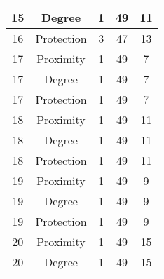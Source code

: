 \documentclass[results.tex]{subfiles}
\begin{document}
\begin{center}
\begin{tabular}{| c || c | c | c | c |}
            \hline
            15                      & Degree                       & 1                      & 49                      & 11                   \\
            \hline
            16                      & Protection                   & 3                      & 47                      & 13                   \\
            \hline
            17                      & Proximity                    & 1                      & 49                      & 7                    \\
            \hline
            17                      & Degree                       & 1                      & 49                      & 7                    \\
            \hline
            17                      & Protection                   & 1                      & 49                      & 7                    \\
            \hline
            18                      & Proximity                    & 1                      & 49                      & 11                   \\
            \hline
            18                      & Degree                       & 1                      & 49                      & 11                   \\
            \hline
            18                      & Protection                   & 1                      & 49                      & 11                   \\
            \hline
            19                      & Proximity                    & 1                      & 49                      & 9                    \\
            \hline
            19                      & Degree                       & 1                      & 49                      & 9                    \\
            \hline
            19                      & Protection                   & 1                      & 49                      & 9                    \\
            \hline
            20                      & Proximity                    & 1                      & 49                      & 15                   \\
            \hline
            20                      & Degree                       & 1                      & 49                      & 15                   \\

\end{tabular}
\end{center}
\end{document}
